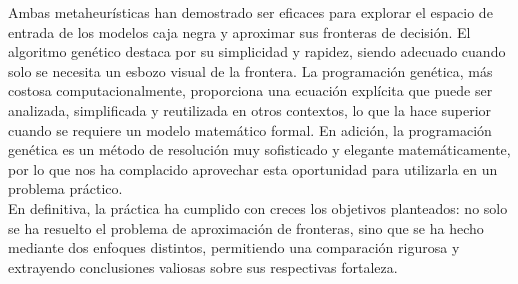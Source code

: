 \documentclass{article}
\begin{document}
Ambas metaheurísticas han demostrado ser eficaces para explorar el espacio de entrada de los modelos caja negra y aproximar sus fronteras de decisión. El algoritmo genético destaca por su simplicidad y rapidez, siendo adecuado cuando solo se necesita un esbozo visual de la frontera. La programación genética, más costosa computacionalmente, proporciona una ecuación explícita que puede ser analizada, simplificada y reutilizada en otros contextos, lo que la hace superior cuando se requiere un modelo matemático formal. En adición, la programación genética es un método de resolución muy sofisticado y elegante matemáticamente, por lo que nos ha complacido aprovechar esta oportunidad para utilizarla en un problema práctico.\\

En definitiva, la práctica ha cumplido con creces los objetivos planteados: no solo se ha resuelto el problema de aproximación de fronteras, sino que se ha hecho mediante dos enfoques distintos, permitiendo una comparación rigurosa y extrayendo conclusiones valiosas sobre sus respectivas fortaleza.
\end{document}
